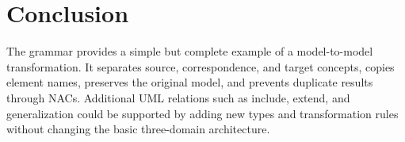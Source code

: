 \documentclass[11pt,a4paper]{article}
\begin{document}
\section{Conclusion}

The grammar provides a simple but complete example of a model-to-model
transformation. It separates source, correspondence, and target concepts,
copies element names, preserves the original model, and prevents duplicate
results through NACs. Additional UML relations such as include, extend, and
generalization could be supported by adding new types and transformation rules
without changing the basic three-domain architecture.
\end{document}
